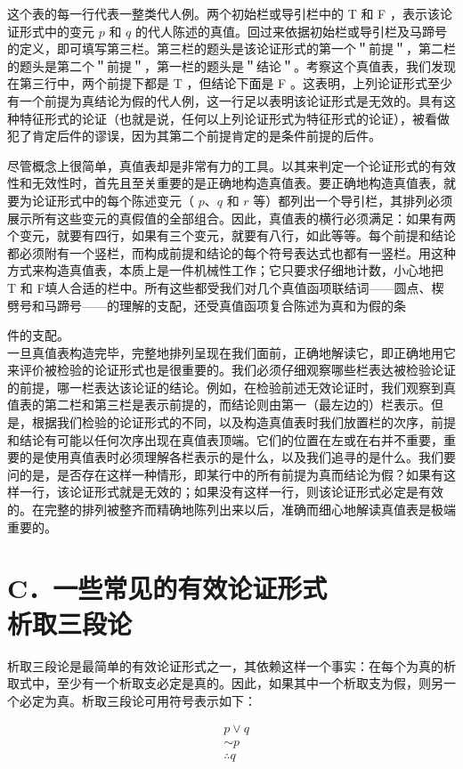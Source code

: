 这个表的每一行代表一整类代人例。两个初始栏或导引栏中的 T 和 F ，表示该论证形式中的变元 $p$ 和 $q$ 的代人陈述的真值。回过来依据初始栏或导引栏及马蹄号的定义，即可填写第三栏。第三栏的题头是该论证形式的第一个＂前提＂，第二栏的题头是第二个＂前提＂，第一栏的题头是＂结论＂。考察这个真值表，我们发现在第三行中，两个前提下都是 T ，但结论下面是 F 。这表明，上列论证形式至少有一个前提为真结论为假的代人例，这一行足以表明该论证形式是无效的。具有这种特征形式的论证（也就是说，任何以上列论证形式为特征形式的论证），被看做犯了肯定后件的谬误，因为其第二个前提肯定的是条件前提的后件。

尽管概念上很简单，真值表却是非常有力的工具。以其来判定一个论证形式的有效性和无效性时，首先且至关重要的是正确地构造真值表。要正确地构造真值表，就要为论证形式中的每个陈述变元（ $p 、 q$ 和 $r$ 等）都列出一个导引栏，其排列必须展示所有这些变元的真假值的全部组合。因此，真值表的横行必须满足：如果有两个变元，就要有四行，如果有三个变元，就要有八行，如此等等。每个前提和结论都必须附有一个竖栏，而构成前提和结论的每个符号表达式也都有一竖栏。用这种方式来构造真值表，本质上是一件机械性工作；它只要求仔细地计数，小心地把 T 和 F填人合适的栏中。所有这些都受我们对几个真值函项联结词——圆点、楔劈号和马蹄号——的理解的支配，还受真值函项复合陈述为真和为假的条

件的支配。\\
一旦真值表构造完毕，完整地排列呈现在我们面前，正确地解读它，即正确地用它来评价被检验的论证形式也是很重要的。我们必须仔细观察哪些栏表达被检验论证的前提，哪一栏表达该论证的结论。例如，在检验前述无效论证时，我们观察到真值表的第二栏和第三栏是表示前提的，而结论则由第一（最左边的）栏表示。但是，根据我们检验的论证形式的不同，以及构造真值表时我们放置栏的次序，前提和结论有可能以任何次序出现在真值表顶端。它们的位置在左或在右并不重要，重要的是使用真值表时必须理解各栏表示的是什么，以及我们追寻的是什么。我们要问的是，是否存在这样一种情形，即某行中的所有前提为真而结论为假？如果有这样一行，该论证形式就是无效的；如果没有这样一行，则该论证形式必定是有效的。在完整的排列被整齐而精确地陈列出来以后，准确而细心地解读真值表是极端重要的。

\section*{C．一些常见的有效论证形式 \\
 析取三段论}
析取三段论是最简单的有效论证形式之一，其依赖这样一个事实：在每个为真的析取式中，至少有一个析取支必定是真的。因此，如果其中一个析取支为假，则另一个必定为真。析取三段论可用符号表示如下：

$$
\begin{aligned}
& p \vee q \\
& \sim p \\
& \therefore q
\end{aligned}
$$

